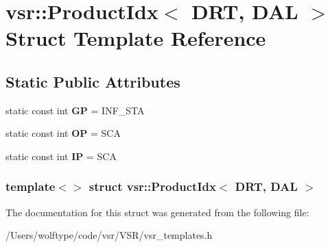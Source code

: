 \hypertarget{structvsr_1_1_product_idx_3_01_d_r_t_00_01_d_a_l_01_4}{\section{vsr\-:\-:Product\-Idx$<$ D\-R\-T, D\-A\-L $>$ Struct Template Reference}
\label{structvsr_1_1_product_idx_3_01_d_r_t_00_01_d_a_l_01_4}
}
\subsection*{Static Public Attributes}
\begin{DoxyCompactItemize}
\item 
\hypertarget{structvsr_1_1_product_idx_3_01_d_r_t_00_01_d_a_l_01_4_aeab21122462004b84cc252e6619704c8}{static const int {\bfseries G\-P} = I\-N\-F\-\_\-\-S\-T\-A}\label{structvsr_1_1_product_idx_3_01_d_r_t_00_01_d_a_l_01_4_aeab21122462004b84cc252e6619704c8}

\item 
\hypertarget{structvsr_1_1_product_idx_3_01_d_r_t_00_01_d_a_l_01_4_ae5e3c952d63521c7b3839b7d8aa58f93}{static const int {\bfseries O\-P} = S\-C\-A}\label{structvsr_1_1_product_idx_3_01_d_r_t_00_01_d_a_l_01_4_ae5e3c952d63521c7b3839b7d8aa58f93}

\item 
\hypertarget{structvsr_1_1_product_idx_3_01_d_r_t_00_01_d_a_l_01_4_a42686c63f3a3d9dbd31ae463335d833a}{static const int {\bfseries I\-P} = S\-C\-A}\label{structvsr_1_1_product_idx_3_01_d_r_t_00_01_d_a_l_01_4_a42686c63f3a3d9dbd31ae463335d833a}

\end{DoxyCompactItemize}
\subsubsection*{template$<$$>$ struct vsr\-::\-Product\-Idx$<$ D\-R\-T, D\-A\-L $>$}



The documentation for this struct was generated from the following file\-:\begin{DoxyCompactItemize}
\item 
/\-Users/wolftype/code/vsr/\-V\-S\-R/vsr\-\_\-templates.\-h\end{DoxyCompactItemize}
